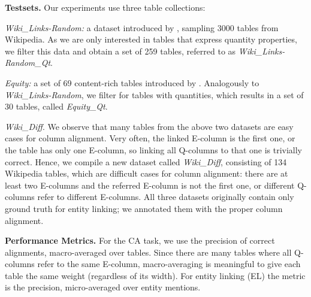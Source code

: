 \vspace{0.1cm}
\noindent \textbf{Testsets.}
Our experiments use three table collections:
\squishlist
\item \textit{Wiki\_Links-Random:} a dataset introduced 
by \cite{DBLP:conf/semweb/BhagavatulaND15}, 
sampling 3000 tables from Wikipedia.
As we are only interested in tables
that express quantity properties, 
we filter this data and obtain a set of 259 tables, referred to as \textit{Wiki\_Links-Random\_Qt}.
\item \textit{Equity:} a set of 69 
content-rich tables introduced by \cite{DBLP:conf/cikm/IbrahimRW16}. Analogously to \textit{Wiki\_Links-Random}, we 
filter for tables with quantities, 
which results in a set of 30 tables, called \textit{Equity\_Qt}.
\item \textit{Wiki\_Diff}. We observe that many tables from the above two datasets are easy cases for column alignment. Very often, the linked E-column is the first one, or the table has only one E-column, so linking all Q-columns to that one is trivially correct. Hence, we compile a new dataset called \textit{Wiki\_Diff}, consisting of 134 Wikipedia tables, which are difficult cases for column alignment:
there are at least two E-columns and the referred E-column is not the first one,
or different Q-columns refer to different E-columns.
\squishend
All three datasets originally contain only ground truth for entity linking; we annotated them with the proper column alignment.

\vspace{0.1cm}
\noindent \textbf{Performance Metrics.}
For the CA task, we 
use the precision of correct alignments,
{macro-averaged} over 
tables.
%
Since there are many tables where all Q-columns
refer to the same E-column, 
macro-averaging is meaningful to give each table the same weight (regardless of its width).
For entity linking (EL) the metric is the
precision, micro-averaged over entity mentions.


